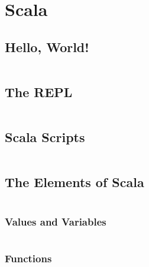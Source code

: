 \chapter{Scala}\label{ch:scala}

\section{Hello, World!}

\begin{lstlisting}[language=Scala]
\end{lstlisting}

\section{The REPL}

\begin{lstlisting}[language=Scala]
\end{lstlisting}


\section{Scala Scripts}

\begin{lstlisting}[language=Scala]
\end{lstlisting}

\section{The Elements of Scala}

\begin{lstlisting}[language=Scala]
\end{lstlisting}

\subsection{Values and Variables}

\begin{lstlisting}[language=Scala]
\end{lstlisting}

\subsection{Functions}

\begin{lstlisting}[language=Scala]
\end{lstlisting}

